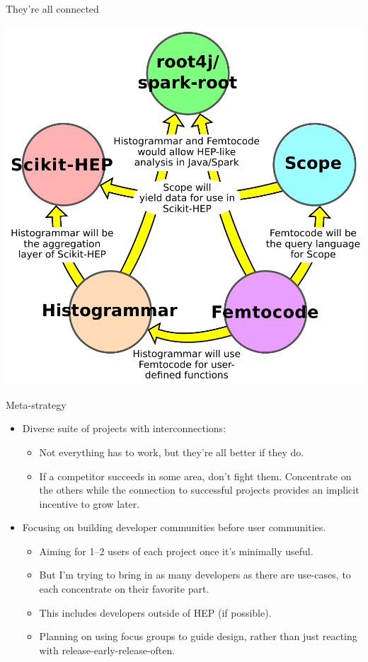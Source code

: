 \documentclass{beamer}
\begin{document}
\begin{frame}{They're all connected}
\begin{center}
\includegraphics[width=0.78\linewidth]{relationships.pdf}
\end{center}
\end{frame}

\begin{frame}{Meta-strategy}
\vspace{0.25 cm}
\begin{itemize}
\item Diverse suite of projects with interconnections:
\begin{itemize}
\item Not everything has to work, but they're all better if they do.
\item If a competitor succeeds in some area, don't fight them. Concentrate on the others while the connection to successful projects provides an implicit incentive to grow later.
\end{itemize}

\item Focusing on building developer communities before user communities.
\begin{itemize}
\item Aiming for 1--2 users of each project once it's minimally useful.
\item But I'm trying to bring in as many developers as there are use-cases, to each concentrate on their favorite part.
\item This includes developers outside of HEP (if possible).
\item Planning on using focus groups to guide design, rather than just reacting with release-early-release-often.
\end{itemize}
\end{itemize}
\end{frame}
\end{document}
